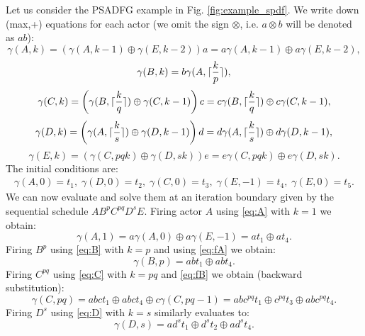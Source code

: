 \documentclass[]{eptcs}
\DeclarePairedDelimiter{\ceil}{\lceil}{\rceil}
\begin{document}
Let us consider the PSADFG example in Fig. \ref{fig:example_spdf}.
We write down (max,+) equations for each actor (we omit the sign $\otimes$, i.e. $a\otimes b$ will be denoted as $ab$):
\begin{equation}
\gamma(A,k) = \left( \gamma(A,k-1) \oplus \gamma(E,k-2) \right)a =  a\gamma(A,k-1) \oplus a\gamma(E,k-2),
\label{eq:A}
\end{equation}
\begin{equation}
\gamma(B,k)= b \gamma(A, \ceil{\frac{k}{p}}),
\label{eq:B}
\end{equation}
\begin{equation}
\gamma(C,k) = \left( \gamma(B,\ceil{\frac{k}{q}}) \oplus \gamma(C,k-1) \right)c =  c\gamma(B,\ceil{\frac{k}{q}}) \oplus c\gamma(C, k-1),
\label{eq:C}
\end{equation}
\begin{equation}
\gamma(D,k) = \left( \gamma(A,\ceil{\frac{k}{s}}) \oplus \gamma(D,k-1) \right)d =  d\gamma(A,\ceil{\frac{k}{s}}) \oplus d\gamma(D, k-1),
\label{eq:D}
\end{equation}
\begin{equation}
\gamma(E,k) = \left( \gamma(C,pqk) \oplus \gamma(D,sk) \right)e =  e\gamma(C,pqk) \oplus e\gamma(D,sk).
\label{eq:E}
\end{equation}
The initial conditions are:
\begin{align}
\gamma(A,0)=t_1,\;
\gamma(D,0)=t_2,\;
\gamma(C,0)=t_3,\;
\gamma(E,-1)=t_4,\;
\gamma(E,0)=t_5.
\end{align}
We can now evaluate and solve them at an iteration boundary given by the sequential schedule $AB^pC^{pq}D^sE$.
Firing actor $A$ using \eqref{eq:A} with $k=1$ we obtain:
\begin{equation}
\gamma(A,1)=a\gamma(A,0) \oplus a\gamma(E,-1)=at_1 \oplus at_4.
\label{eq:fA}
\end{equation}
Firing $B^p$ using \eqref{eq:B} with $k=p$ and using \eqref{eq:fA} we obtain:
\begin{equation}
\gamma(B,p)=abt_1 \oplus abt_4.
\label{eq:fB}
\end{equation}
Firing $C^{pq}$ using \eqref{eq:C} with $k=pq$ and \eqref{eq:fB} we obtain (backward substitution):
\begin{equation}
\gamma(C, pq)= abct_1 \oplus abct_4 \oplus c\gamma(C, pq-1)=abc^{pq}t_1 \oplus c^{pq}t_3 \oplus abc^{pq}t_4.
\label{eq:fCfinal}
\end{equation}
Firing $D^s$ using \eqref{eq:D} with $k=s$ similarly evaluates to:
\begin{equation}
\gamma(D, s)=ad^st_1 \oplus d^st_2  \oplus ad^st_4.
\label{eq:fD}
\end{equation}
\end{document}

